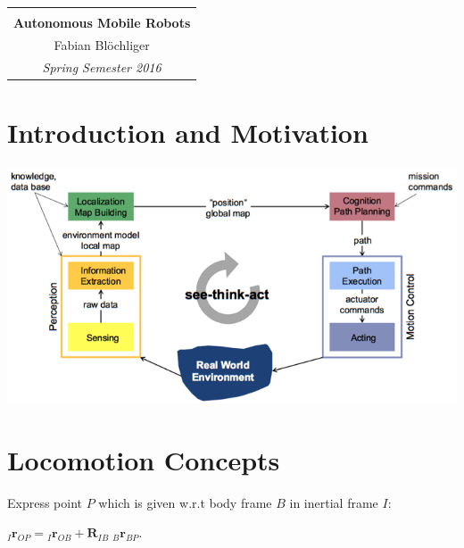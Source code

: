 \documentclass[landscape]{article}
\newcommand{\vmspace}{\vspace{-7pt}}
\newcommand{\vtspace}{\vspace{-10pt}}
\begin{document}
\pagestyle{empty}
\raggedright
\setlength{\columnsep}{2mm}
\setlength{\columnseprule}{0.1mm}
\renewcommand{\labelitemi}{--}

\begin{multicols}{3}


\begin{tabular}{|c|}\hline
  \\[-8pt]
  \LARGE \textbf{Autonomous Mobile Robots}\\[6pt]
  \large Fabian Bl\"ochliger\\[6pt]
  \large \textit{Spring Semester 2016}\\\hline
\end{tabular}

\vtspace

\section{Introduction and Motivation}

\vmspace

\includegraphics[width=\columnwidth]{img/1_SeeThinkAct.png}

\vspace{-12pt}

\section{Locomotion Concepts}

\vmspace

\begin{minipage}{\columnwidth}
  Express point $P$ which is given w.r.t body frame $B$ in inertial frame $I$:
  \vmspace
  \vmspace
  \begin{center}
  ${}_I\mathbf{r}_{OP} = {}_I\mathbf{r}_{OB} +
  \mathbf{R}_{IB}\;{}_B\mathbf{r}_{BP}$.
  \end{center}
\end{minipage}


\end{multicols}
\end{document}
